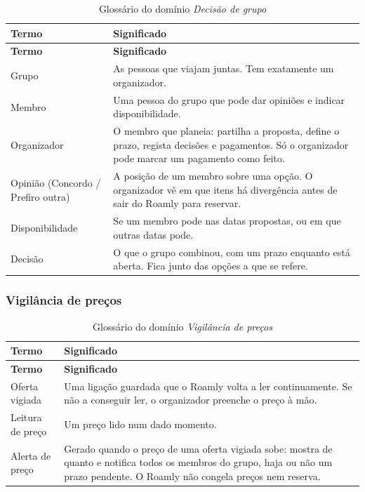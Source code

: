\begin{longtable}{@{}p{4cm}p{11.3cm}@{}}
\caption{Glossário do domínio \textit{Decisão de grupo}}\label{tab:glossario-decisão}\\
\toprule \textbf{Termo} & \textbf{Significado} \\ \midrule \endfirsthead
\toprule \textbf{Termo} & \textbf{Significado} \\ \midrule \endhead
Grupo & As pessoas que viajam juntas. Tem exatamente um organizador.  \\
Membro & Uma pessoa do grupo que pode dar opiniões e indicar disponibilidade.  \\
Organizador & O membro que planeia: partilha a proposta, define o prazo, regista decisões e pagamentos. Só o organizador pode marcar um pagamento como feito.  \\
Opinião (\guillemotleft{}Concordo\guillemotright{} / \guillemotleft{}Prefiro outra\guillemotright{}) & A posição de um membro sobre uma opção. O organizador vê em que itens há divergência antes de sair do Roamly para reservar.  \\
Disponibilidade & Se um membro pode nas datas propostas, ou em que outras datas pode.  \\
Decisão & O que o grupo combinou, com um prazo enquanto está aberta. Fica junto das opções a que se refere.  \\
\bottomrule
\end{longtable}

\subsubsection{Vigilância de preços}

\begin{longtable}{@{}p{4cm}p{11.3cm}@{}}
\caption{Glossário do domínio \textit{Vigilância de preços}}\label{tab:glossario-vigilância}\\
\toprule \textbf{Termo} & \textbf{Significado} \\ \midrule \endfirsthead
\toprule \textbf{Termo} & \textbf{Significado} \\ \midrule \endhead
Oferta vigiada & Uma ligação guardada que o Roamly volta a ler continuamente. Se não a conseguir ler, o organizador preenche o preço à mão.  \\
Leitura de preço & Um preço lido num dado momento.  \\
Alerta de preço & Gerado quando o preço de uma oferta vigiada sobe: mostra de quanto e notifica todos os membros do grupo, haja ou não um prazo pendente. O Roamly não congela preços nem reserva.  \\
\bottomrule
\end{longtable}

